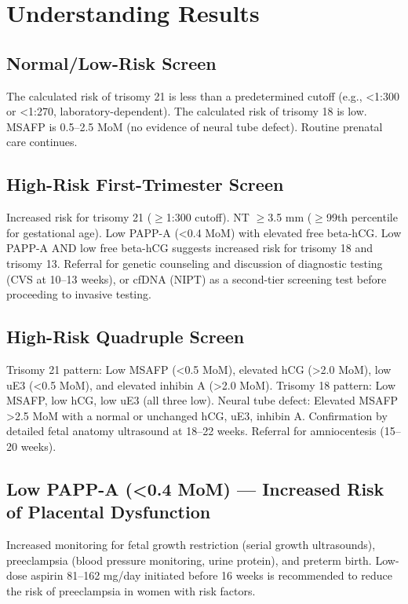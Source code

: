 \section*{Understanding Results}

\subsection*{Normal/Low-Risk Screen}
The calculated risk of trisomy 21 is less than a predetermined cutoff (e.g., <1:300 or <1:270, laboratory-dependent). The calculated risk of trisomy 18 is low. MSAFP is 0.5--2.5 MoM (no evidence of neural tube defect). Routine prenatal care continues.

\subsection*{High-Risk First-Trimester Screen}
Increased risk for trisomy 21 ($\geq$1:300 cutoff). NT $\geq$3.5 mm ($\geq$99th percentile for gestational age). Low PAPP-A (<0.4 MoM) with elevated free beta-hCG. Low PAPP-A AND low free beta-hCG suggests increased risk for trisomy 18 and trisomy 13. Referral for genetic counseling and discussion of diagnostic testing (CVS at 10--13 weeks), or cfDNA (NIPT) as a second-tier screening test before proceeding to invasive testing.

\subsection*{High-Risk Quadruple Screen}
Trisomy 21 pattern: Low MSAFP (<0.5 MoM), elevated hCG (>2.0 MoM), low uE3 (<0.5 MoM), and elevated inhibin A (>2.0 MoM). Trisomy 18 pattern: Low MSAFP, low hCG, low uE3 (all three low). Neural tube defect: Elevated MSAFP >2.5 MoM with a normal or unchanged hCG, uE3, inhibin A. Confirmation by detailed fetal anatomy ultrasound at 18--22 weeks. Referral for amniocentesis (15--20 weeks).

\subsection*{Low PAPP-A (<0.4 MoM) --- Increased Risk of Placental Dysfunction}
Increased monitoring for fetal growth restriction (serial growth ultrasounds), preeclampsia (blood pressure monitoring, urine protein), and preterm birth. Low-dose aspirin 81--162 mg/day initiated before 16 weeks is recommended to reduce the risk of preeclampsia in women with risk factors.

